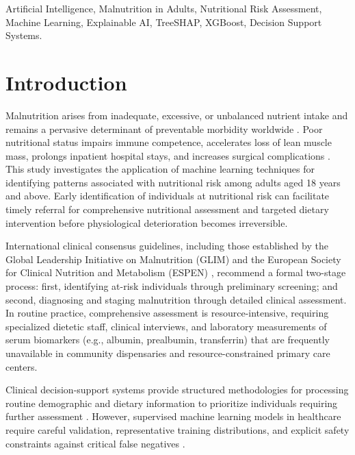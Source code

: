 \documentclass[conference]{IEEEtran}
\begin{document}
\begin{IEEEkeywords}
Artificial Intelligence, Malnutrition in Adults, Nutritional Risk Assessment, Machine Learning, Explainable AI, TreeSHAP, XGBoost, Decision Support Systems.
\end{IEEEkeywords}

\section{Introduction}
\label{sec:intro}
Malnutrition arises from inadequate, excessive, or unbalanced nutrient intake and remains a pervasive determinant of preventable morbidity worldwide \cite{fao2023sofi}. Poor nutritional status impairs immune competence, accelerates loss of lean muscle mass, prolongs inpatient hospital stays, and increases surgical complications \cite{unicef2021malnutrition, cederholm2019glim}. This study investigates the application of machine learning techniques for identifying patterns associated with nutritional risk among adults aged 18 years and above. Early identification of individuals at nutritional risk can facilitate timely referral for comprehensive nutritional assessment and targeted dietary intervention before physiological deterioration becomes irreversible.

International clinical consensus guidelines, including those established by the Global Leadership Initiative on Malnutrition (GLIM) \cite{cederholm2019glim} and the European Society for Clinical Nutrition and Metabolism (ESPEN) \cite{kondrup2003espen}, recommend a formal two-stage process: first, identifying at-risk individuals through preliminary screening; and second, diagnosing and staging malnutrition through detailed clinical assessment. In routine practice, comprehensive assessment is resource-intensive, requiring specialized dietetic staff, clinical interviews, and laboratory measurements of serum biomarkers (e.g., albumin, prealbumin, transferrin) that are frequently unavailable in community dispensaries and resource-constrained primary care centers.

Clinical decision-support systems provide structured methodologies for processing routine demographic and dietary information to prioritize individuals requiring further assessment \cite{rajkomar2018scalable, wiens2018machine}. However, supervised machine learning models in healthcare require careful validation, representative training distributions, and explicit safety constraints against critical false negatives \cite{topol2019high, amann2020explainability}. 
\end{document}
